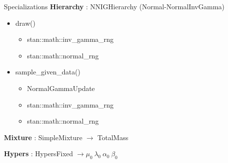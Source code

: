 \begin{frame}{Specializations}
\textbf{Hierarchy} : NNIGHierarchy (Normal-NormalInvGamma)
	\begin{itemize}
		\item draw()
		\begin{itemize}
			\item stan::math::inv\_gamma\_rng
			\item stan::math::normal\_rng
		\end{itemize}
		\item sample\_given\_data()
		\begin{itemize}
			\item NormalGammaUpdate
			\item stan::math::inv\_gamma\_rng
			\item stan::math::normal\_rng
		\end{itemize}
	\end{itemize}
\textbf{Mixture} : SimpleMixture $ \rightarrow$ TotalMass

\textbf{Hypers} : HypersFixed $ \rightarrow \mu_0 \ \lambda_0 \ \alpha_0 \ \beta_0 $

\end{frame}


